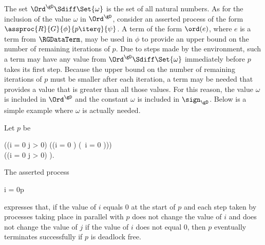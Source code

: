 \documentclass[runningheads]{llncs}
\begin{document}
The set $\Ord^\gD \Sdiff \Set{\omega}$ is the set of all natural 
numbers.
As for the inclusion of the value $\omega$ in $\Ord^\gD$, consider an 
asserted process of the form 
$\assproc{R}{G}{\phi}{p \iter q}{\psi}$.
A term of the form $\ord(e)$, where $e$ is a term from $\RGDataTerm$,
may be used in $\phi$ to provide an upper bound on the number of 
remaining iterations of $p$.
Due to steps made by the environment, such a term may have any value 
from $\Ord^\gD \Sdiff \Set{\omega}$ immediately before $p$ takes its 
first step.
Because the upper bound on the number of remaining iterations of $p$ 
must be smaller after each iteration, a term may be needed that provides
a value that is greater than all those values.
For this reason, the value $\omega$ is included in $\Ord^\gD$ and the 
constant $\omega$ is included in $\sign_\gD$.
Below is a simple example where $\omega$ is actually needed.

Let $p$ be 
\begin{ldispl}
((i = 0 \Lor j > 0) \gc ((i = 0 \gc {}) \altc
 (\Lnot\, i = 0 \gc {})))
\phantom{\;.} \quad \\ \hfill {}
\iter
(\Lnot (i = 0 \Lor j > 0) \gc \ep)\;.
\end{ldispl}%
The asserted process
\begin{ldispl}
        {i = 0}{p}{\True}
\end{ldispl}%
expresses that,
if the value of $i$ equals $0$ at the start of $p$ and each step taken 
by processes taking place in parallel with $p$ does not change the value 
of $i$ and does not change the value of $j$ if the value of $i$ does not
equal $0$, then $p$ eventually terminates successfully if $p$ is 
deadlock free.
\end{document}
